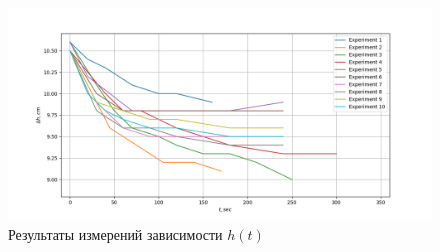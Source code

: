 \documentclass[a4paper,12pt]{report}
\begin{document}
    \begin{figure}[H]
        \centering
        \includegraphics*[width=1\linewidth]{h(t).png}
        \caption{Результаты измерений зависимости $h(t)$}
    \end{figure}    
\end{document}
